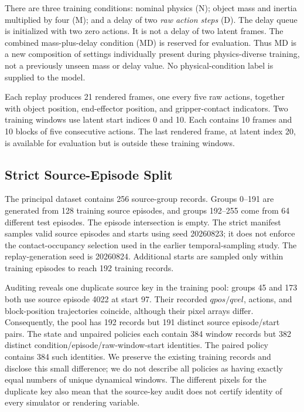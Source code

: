 There are three training conditions: nominal physics (N); object mass and inertia multiplied by four (M); and a delay of two \emph{raw action steps} (D). The delay queue is initialized with two zero actions. It is not a delay of two latent frames. The combined mass-plus-delay condition (MD) is reserved for evaluation. Thus MD is a new composition of settings individually present during physics-diverse training, not a previously unseen mass or delay value. No physical-condition label is supplied to the model.

Each replay produces 21 rendered frames, one every five raw actions, together with object position, end-effector position, and gripper-contact indicators. Two training windows use latent start indices 0 and 10. Each contains 10 frames and 10 blocks of five consecutive actions. The last rendered frame, at latent index 20, is available for evaluation but is outside these training windows.

\subsection{Strict Source-Episode Split}
\label{sec:split}
The principal dataset contains 256 source-group records. Groups 0--191 are generated from 128 training source episodes, and groups 192--255 come from 64 different test episodes. The episode intersection is empty. The strict manifest samples valid source episodes and starts using seed 20260823; it does not enforce the contact-occupancy selection used in the earlier temporal-sampling study. The replay-generation seed is 20260824. Additional starts are sampled only within training episodes to reach 192 training records.

Auditing reveals one duplicate source key in the training pool: groups 45 and 173 both use source episode 4022 at start 97. Their recorded $qpos/qvel$, actions, and block-position trajectories coincide, although their pixel arrays differ. Consequently, the pool has 192 records but 191 distinct source episode/start pairs. The state and unpaired policies each contain 384 window records but 382 distinct condition/episode/raw-window-start identities. The paired policy contains 384 such identities. We preserve the existing training records and disclose this small difference; we do not describe all policies as having exactly equal numbers of unique dynamical windows. The different pixels for the duplicate key also mean that the source-key audit does not certify identity of every simulator or rendering variable.

